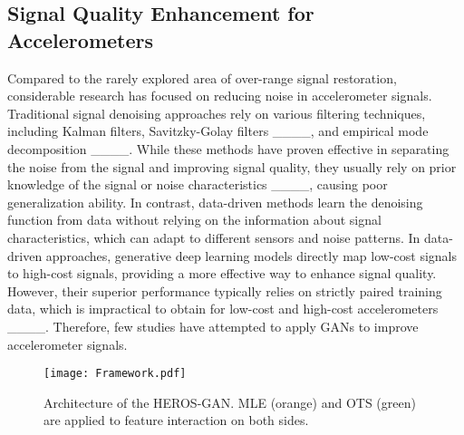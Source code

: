 \subsection{Signal Quality Enhancement for Accelerometers}
Compared to the rarely explored area of over-range signal restoration, considerable research has focused on reducing noise in accelerometer signals.
Traditional signal denoising approaches rely on various filtering techniques, including Kalman filters, Savitzky-Golay filters ____, and empirical mode decomposition ____. While these methods have proven effective in separating the noise from the signal and improving signal quality, they usually rely on prior knowledge of the signal or noise characteristics ____, causing poor generalization ability.
In contrast, data-driven methods learn the denoising function from data without relying on the information about signal characteristics, which can adapt to different sensors and noise patterns.
In data-driven approaches, generative deep learning models directly map low-cost signals to high-cost signals, providing a more effective way to enhance signal quality. However, their superior performance typically relies on strictly paired training data, which is impractical to obtain for low-cost and high-cost accelerometers ____.
Therefore, few studies have attempted to apply GANs to improve accelerometer signals. 



\begin{figure*}[t]
	\centering
	\texttt{[image: Framework.pdf]} %
	\caption{Architecture of the HEROS-GAN. MLE (orange) and OTS (green) are applied to feature interaction on both sides.}
	\label{Framework of HEROS-GAN}
\end{figure*}